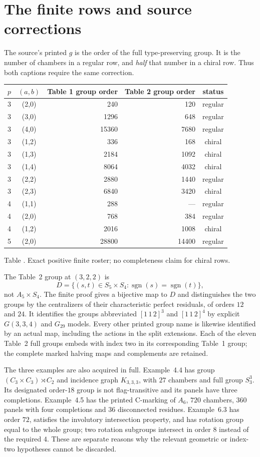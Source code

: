 \documentclass[11pt,a4paper]{article}
\begin{document}
\section{The finite rows and source corrections}
The source's printed $g$ is the order of the full type-preserving group.
It is the number of chambers in a regular row, and \emph{half} that number
in a chiral row. Thus both captions require the same correction.
\begin{center}
\begin{tabular}{ccrrc}\toprule
$p$&$(a,b)$&Table 1 group order&Table 2 group order&status\\\midrule
3&(2,0)&240&120&regular\\
3&(3,0)&1296&648&regular\\
3&(4,0)&15360&7680&regular\\
3&(1,2)&336&168&chiral\\
3&(1,3)&2184&1092&chiral\\
3&(1,4)&8064&4032&chiral\\
3&(2,2)&2880&1440&regular\\
3&(2,3)&6840&3420&chiral\\
4&(1,1)&288&---&regular\\
4&(2,0)&768&384&regular\\
4&(1,2)&2016&1008&chiral\\
5&(2,0)&28800&14400&regular\\\bottomrule
\end{tabular}
\end{center}
\label{finite}
\begin{center}\small Table \thetable. Exact positive finite roster; no completeness claim for chiral rows.\end{center}
The Table~2 group at $(3,2,2)$ is
\[
 D=\{(s,t)\in S_5\times S_4:\operatorname{sgn}(s)=\operatorname{sgn}(t)\},
\]
not $A_5\times S_4$. The finite proof gives a bijective map to $D$ and
distinguishes the two groups by the centralizers of their characteristic
perfect residuals, of orders $12$ and $24$. It identifies the groups
abbreviated $[1\,1\,2]^3$ and $[1\,1\,2]^4$ by explicit $G(3,3,4)$ and
$G_{29}$ models. Every other printed group name is likewise identified by
an actual map, including the actions in the split extensions. Each of the
eleven Table~2 full groups embeds with index two in its corresponding
Table~1 group; the complete marked halving maps and complements are retained.

The three examples are also acquired in full. Example~4.4 has group
$(C_3\times C_3)\rtimes C_2$ and incidence graph $K_{3,3,3}$, with
$27$ chambers and full group $S_3^3$. Its designated order-$18$ group is
not flag-transitive and its panels have three completions. Example~4.5
has the printed C-marking of $A_6$, $720$ chambers, $360$ panels with four
completions and $36$ disconnected residues. Example~6.3 has order $72$,
satisfies the involutory intersection property, and has rotation group
equal to the whole group; two rotation subgroups intersect in order $8$
instead of the required $4$. These are separate reasons why the relevant
geometric or index-two hypotheses cannot be discarded.
\end{document}
